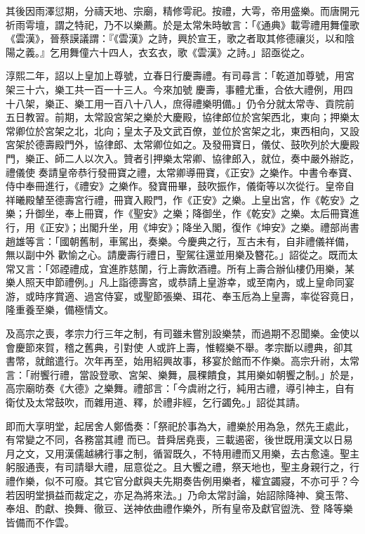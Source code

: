 \begin{pinyinscope}
 其後因雨澤愆期，分禱天地、宗廟，精修雩祀。按禮，大雩，帝用盛樂。而唐開元祈雨雩壇，謂之特祀，乃不以樂薦。於是太常朱時敏言：「《通典》載雩禮用舞僮歌《雲漢》，晉蔡謨議謂：『《雲漢》之詩，興於宣王，歌之者取其修德禳災，以和陰陽之義。』乞用舞僮六十四人，衣玄衣，歌《雲漢》之詩。」詔亟從之。



 淳熙二年，詔以上皇加上尊號，立春日行慶壽禮。有司尋言：「乾道加尊號，用宮架三十六，樂工共一百一十三人。今來加號
 慶壽，事體尤重，合依大禮例，用四十八架，樂正、樂工用一百八十八人，庶得禮樂明備。」仍令分就太常寺、貢院前五日教習。前期，太常設宮架之樂於大慶殿，協律郎位於宮架西北，東向；押樂太常卿位於宮架之北，北向；皇太子及文武百僚，並位於宮架之北，東西相向，又設宮架於德壽殿門外，協律郎、太常卿位如之。及發冊寶日，儀仗、鼓吹列於大慶殿門，樂正、師二人以次入。贊者引押樂太常卿、協律郎入，就位，奏中嚴外辦訖，禮儀使
 奏請皇帝恭行發冊寶之禮，太常卿導冊寶，《正安》之樂作。中書令奉寶、侍中奉冊進行，《禮安》之樂作。發寶冊畢，鼓吹振作，儀衛等以次從行。皇帝自祥曦殿輦至德壽宮行禮，冊寶入殿門，作《正安》之樂。上皇出宮，作《乾安》之樂；升御坐，奉上冊寶，作《聖安》之樂；降御坐，作《乾安》之樂。太后冊寶進行，用《正安》；出閣升坐，用《坤安》；降坐入閣，復作《坤安》之樂。禮部尚書趙雄等言：「國朝舊制，車駕出，奏樂。今慶典之行，亙古未有，自非禮儀祥備，無以副中外
 歡愉之心。請慶壽行禮日，聖駕往還並用樂及簪花。」詔從之。既而太常又言：「郊禋禮成，宜進胙慈闈，行上壽飲酒禮。所有上壽合辦仙樓仍用樂，某樂人照天申節禮例。」凡上詣德壽宮，或恭請上皇游幸，或至南內，或上皇命同宴游，或時序賞適、過宮侍宴，或聖節張樂、珥花、奉玉卮為上皇壽，率從容竟日，隆重養至樂，備極情文。



 及高宗之喪，孝宗力行三年之制，有司雖未嘗別設樂禁，而過期不忍聞樂。金使以會慶節來賀，稽之舊典，引對使
 人或許上壽，惟輟樂不舉。孝宗斷以禮典，卻其書幣，就館遣行。次年再至，始用紹興故事，移宴於館而不作樂。高宗升祔，太常言：「祔饗行禮，當設登歌、宮架、樂舞，晨稞饋食，其用樂如朝饗之制。」於是，高宗廟昉奏《大德》之樂舞。禮部言：「今虞祔之行，純用古禮，導引神主，自有衛仗及太常鼓吹，而雜用道、釋，於禮非經，乞行蠲免。」詔從其請。



 即而大享明堂，起居舍人鄭僑奏：「祭祀於事為大，禮樂於用為急，然先王處此，有常變之不同，各務當其禮
 而已。昔舜居堯喪，三載遏密，後世既用漢文以日易月之文，又用漢儒越紼行事之制，循習既久，不特用禮而又用樂，去古愈遠。聖主躬服通喪，有司請舉大禮，屈意從之。且大饗之禮，祭天地也，聖主身親行之，行禮作樂，似不可廢。其它官分獻與夫先期奏告例用樂者，權宜蠲寢，不亦可乎？今若因明堂損益而裁定之，亦足為將來法。」乃命太常討論，始詔除降神、奠玉幣、奉俎、酌獻、換舞、徹豆、送神依曲禮作樂外，所有皇帝及獻官盥洗、登
 降等樂皆備而不作雲。



\end{pinyinscope}